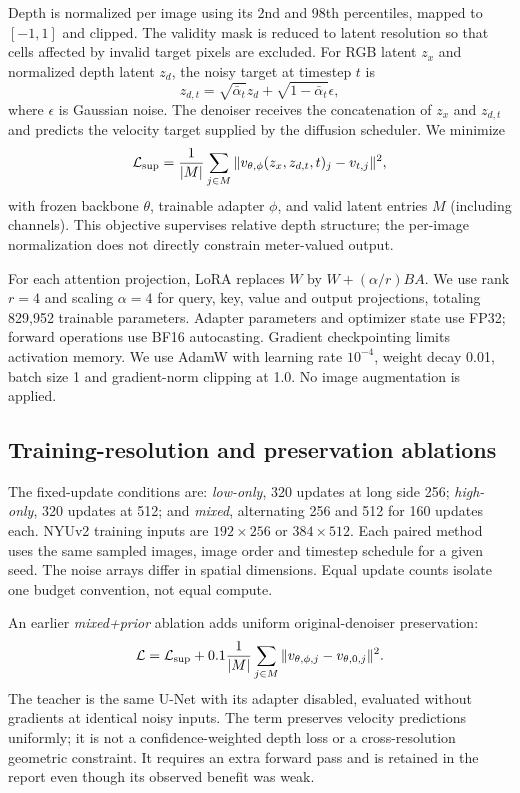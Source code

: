 \documentclass[10pt,twocolumn,letterpaper]{article}
\begin{document}
Depth is normalized per image using its 2nd and 98th percentiles, mapped to $[-1,1]$ and clipped. The validity mask is reduced to latent resolution so that cells affected by invalid target pixels are excluded. For RGB latent $z_x$ and normalized depth latent $z_d$, the noisy target at timestep $t$ is
\begin{equation}
z_{d,t}=\sqrt{\bar\alpha_t}z_d+\sqrt{1-\bar\alpha_t}\epsilon,
\end{equation}
where $\epsilon$ is Gaussian noise. The denoiser receives the concatenation of $z_x$ and $z_{d,t}$ and predicts the velocity target supplied by the diffusion scheduler. We minimize
\begin{equation}
\mathcal L_{\rm sup}=\frac{1}{|M|}\sum_{j\in M}\|v_{\theta,\phi}(z_x,z_{d,t},t)_j-v_{t,j}\|^2,
\end{equation}
with frozen backbone $\theta$, trainable adapter $\phi$, and valid latent entries $M$ (including channels). This objective supervises relative depth structure; the per-image normalization does not directly constrain meter-valued output.

For each attention projection, LoRA replaces $W$ by $W+(\alpha/r)BA$. We use rank $r=4$ and scaling $\alpha=4$ for query, key, value and output projections, totaling 829,952 trainable parameters. Adapter parameters and optimizer state use FP32; forward operations use BF16 autocasting. Gradient checkpointing limits activation memory. We use AdamW with learning rate $10^{-4}$, weight decay 0.01, batch size 1 and gradient-norm clipping at 1.0. No image augmentation is applied.

\subsection{Training-resolution and preservation ablations}
The fixed-update conditions are: \textit{low-only}, 320 updates at long side 256; \textit{high-only}, 320 updates at 512; and \textit{mixed}, alternating 256 and 512 for 160 updates each. NYUv2 training inputs are $192\times256$ or $384\times512$. Each paired method uses the same sampled images, image order and timestep schedule for a given seed. The noise arrays differ in spatial dimensions. Equal update counts isolate one budget convention, not equal compute.

An earlier \textit{mixed+prior} ablation adds uniform original-denoiser preservation:
\begin{equation}
\mathcal L=\mathcal L_{\rm sup}+0.1\frac{1}{|M|}\sum_{j\in M}\|v_{\theta,\phi,j}-v_{\theta,0,j}\|^2.
\end{equation}
The teacher is the same U-Net with its adapter disabled, evaluated without gradients at identical noisy inputs. The term preserves velocity predictions uniformly; it is not a confidence-weighted depth loss or a cross-resolution geometric constraint. It requires an extra forward pass and is retained in the report even though its observed benefit was weak.
\end{document}
